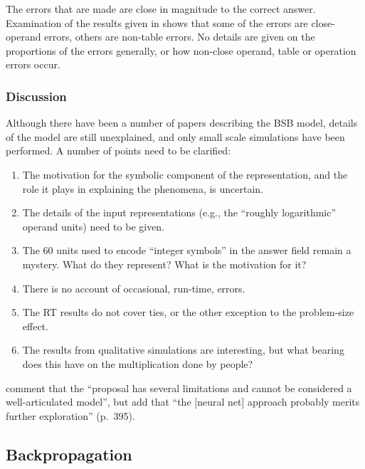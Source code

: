 The errors that are made are close in magnitude to the correct answer.
Examination of the results given in  shows that some of the
errors are close-operand errors, others are non-table errors. No details
are given on the proportions of the errors generally, or how
non-close operand, table or operation errors occur.

\subsubsection{Discussion}

Although there have been a number of papers describing the BSB model,
details of the model are still unexplained, and only small scale
simulations have been performed.  A number of points need to be clarified:
\begin{enumerate}

\item The motivation for the symbolic component of the representation, and
the role it plays in explaining the phenomena, is uncertain.

\item The details of the input representations (e.g., the ``roughly
logarithmic'' operand units) need to be given.

\item The 60 units used to encode ``integer symbols'' in the answer field
remain a mystery. What do they represent? What is the motivation for
it?

\item There is no account of occasional, run-time, errors.

\item The RT results do not cover ties, or the other exception to the
problem-size effect.

\item  The results from qualitative simulations are interesting, but what
bearing does this have on the multiplication done by people?

\end{enumerate}

 comment that the  ``proposal has several
limitations and cannot be considered a well-articulated model'', but add
that ``the [neural net] approach probably merits further exploration''
(p.~395).

\subsection{Backpropagation}

